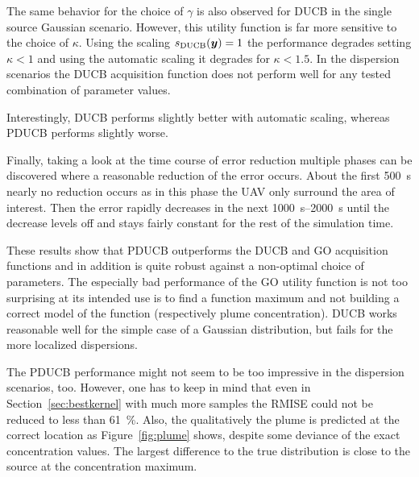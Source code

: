 The same behavior for the choice of $\gamma$ is also observed for DUCB in the 
single source Gaussian scenario. However, this utility function is far more 
sensitive to the choice of $\kappa$. Using the scaling $s_{\mathrm{DUCB}}(\bm{y}) = 1$ 
the performance degrades setting $\kappa < 1$ and using the automatic scaling it 
degrades for $\kappa < 1.5$. In the dispersion scenarios the DUCB acquisition 
function does not perform well for any tested combination of parameter values.

Interestingly,  DUCB performs slightly better with automatic scaling, whereas 
PDUCB performs slightly worse.

Finally, taking a look at the time course of error reduction multiple phases can 
be discovered where a reasonable reduction of the error occurs. About the first 
\SI{500}{\second} nearly no reduction occurs as in this phase the UAV only 
surround the area of interest. Then the error rapidly decreases in the next 
\SIrange{1000}{2000}{\second} until the decrease levels off and stays fairly 
constant for the rest of the simulation time.

These results show that PDUCB outperforms the DUCB and GO acquisition functions 
and in addition is quite robust against a non-optimal choice of parameters. The 
especially bad performance of the GO utility function is not too surprising at 
its intended use is to find a function maximum and not building a correct model 
of the function (respectively plume concentration).  DUCB works reasonable well 
for the simple case of a Gaussian distribution, but fails for the more localized 
dispersions.

The PDUCB performance might not seem to be too impressive in the dispersion 
scenarios, too. However, one has to keep in mind that even in 
Section~\ref{sec:bestkernel} with much more samples the RMISE could not be 
reduced to less than \SI{61}{\percent}.  Also, the qualitatively the plume is 
predicted at the correct location as Figure~\ref{fig:plume} shows, despite some 
deviance of the exact concentration values. The largest difference to the true 
distribution is close to the source at the concentration maximum.

